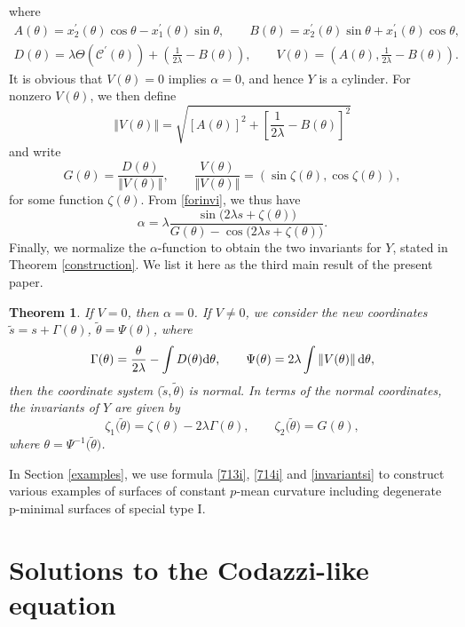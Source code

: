 \documentclass[10pt,a4paper]{amsart}
\numberwithin{equation}{section}
\newtheorem{theoremA}{Theorem}
\begin{document}
where
\begin{gather*} %
A(\theta)=x^{\prime }_{2}(\theta)\cos{\theta}-x^{\prime }_{1}(\theta)\sin{\theta},\qquad B(\theta)=x^{\prime }_{2}(\theta)\sin{\theta}+x^{\prime }_{1}(\theta)\cos{\theta}, \\
D(\theta)=\lambda \Theta(\mathcal{C}^{\prime }(\theta))+\left(\frac{1}{2\lambda}-B(\theta)\right),\qquad V(\theta)=\left( A(\theta ),\frac{1}{2\lambda }-B(\theta )\right).
\end{gather*}
It is obvious that $V(\theta )=0$ implies $\alpha=0$, and hence $Y$ is a cylinder. For nonzero $V(\theta )$, we then define
\[\left\Vert V(\theta)\right \Vert =\sqrt{\left[ A( \theta ) \right] ^{2}+
\left[ \frac{1}{2\lambda }-B(\theta )\right] ^{2}}\]
and write
\[
G(\theta )=\frac{D(\theta )}{ \Vert V(\theta) \Vert },\qquad \frac{V(\theta)}{ \Vert V(\theta) \Vert }=(\sin {\zeta (\theta )},\cos {\zeta
(\theta )}),
\]
for some function $\zeta {(\theta )}$.
From \eqref{forinvi}, we thus have
\[\alpha=\lambda \frac{\sin {\bigl(2\lambda s+\zeta {(\theta )}\bigr)}}{G(\theta
)-\cos {\bigl(2\lambda s+\zeta {(\theta )}\bigr)}}.\]
Finally, we normalize the $\alpha$-function to obtain the two invariants for $Y$, stated in Theorem \ref{construction}. We list it here as the third main result of the present paper.


\begin{theoremA}\label{TheoremC}
If $V=0$, then $\alpha=0$. If $V\neq 0$, we consider the new coordinates
$
\tilde{s}=s+\Gamma(\theta)$, $ \tilde{\theta}=\Psi( \theta)$,
where
\[
\Gamma(\theta)=\frac{\theta }{2\lambda}-\int D( \theta){\rm d}\theta,\qquad
\Psi(\theta)=2\lambda \int \left \Vert V(\theta)\right \Vert {\rm d}\theta ,
\]
then the coordinate system $\bigl(\tilde{s},\tilde{\theta}\bigr)$ is normal. In terms of the
normal coordinates, the invariants of $Y$ are given by
\begin{equation}\label{invariantsi}
\zeta _{1}\bigl( \tilde{\theta}\bigr) = \zeta (\theta) -2\lambda \Gamma (\theta), \qquad
\zeta _{2}\bigl( \tilde{\theta}\bigr) = G(\theta),
\end{equation}
where $\theta= \Psi ^{-1}\bigl( \tilde{\theta}\bigr)$.
\end{theoremA}


In Section \ref{examples}, we use formula \eqref{713i}, \eqref{714i} and \eqref{invariantsi} to construct various examples of surfaces of constant $p$-mean curvature including degenerate p-minimal surfaces of special type I.


\section{Solutions to the Codazzi-like equation}
\end{document}
